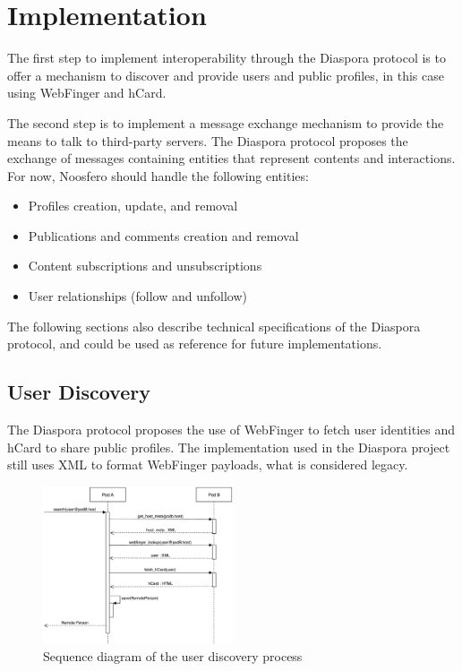 \chapter{Implementation}
\label{chapter:5}

The first step to implement interoperability through the Diaspora
protocol is to offer a mechanism to discover and provide users and
public profiles, in this case using WebFinger and hCard.

The second step is to implement a message exchange mechanism to provide
the means to talk to third-party servers. The Diaspora protocol proposes
the exchange of messages containing entities that represent contents and
interactions. For now, Noosfero should handle the following entities:

\begin{itemize}
  \item Profiles creation, update, and removal
  \item Publications and comments creation and removal
  \item Content subscriptions and unsubscriptions
  \item User relationships (follow and unfollow)
\end{itemize}

The following sections also describe technical specifications of the
Diaspora protocol, and could be used as reference for future
implementations.

\section{User Discovery}

The Diaspora protocol proposes the use of WebFinger to fetch user
identities and hCard to share public profiles. The implementation used
in the Diaspora project still uses XML to format WebFinger payloads,
what is considered legacy.

\begin{figure}[h]
	\centering
		\includegraphics[width=0.5\textwidth]{figures/seq_descoberta.eps}
	\caption{Sequence diagram of the user discovery process}
	\label{fig:seq_discovery}
\end{figure}

